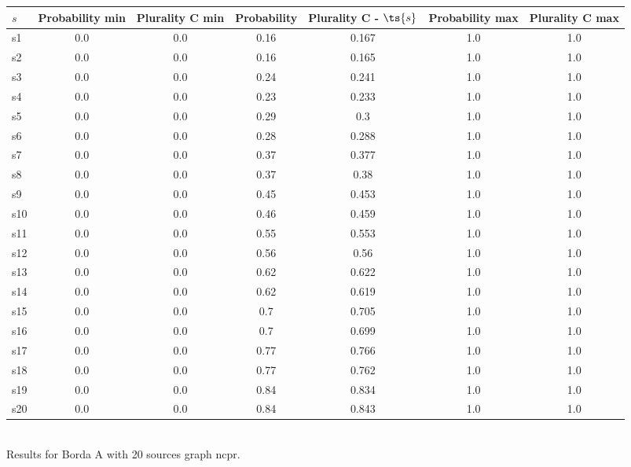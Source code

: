 \documentclass{article}
\begin{document}
\noindent\begin{tabular}{|l|c|c|c|c|c|c|}
\hline
$s$& Probability min & Plurality C min & Probability & Plurality C - $\ts{s}$ & Probability max & Plurality C max\\
\hline
s1 &0.0 & 0.0 & 0.16 & 0.167 & 1.0 & 1.0\\
\hline
s2 &0.0 & 0.0 & 0.16 & 0.165 & 1.0 & 1.0\\
\hline
s3 &0.0 & 0.0 & 0.24 & 0.241 & 1.0 & 1.0\\
\hline
s4 &0.0 & 0.0 & 0.23 & 0.233 & 1.0 & 1.0\\
\hline
s5 &0.0 & 0.0 & 0.29 & 0.3 & 1.0 & 1.0\\
\hline
s6 &0.0 & 0.0 & 0.28 & 0.288 & 1.0 & 1.0\\
\hline
s7 &0.0 & 0.0 & 0.37 & 0.377 & 1.0 & 1.0\\
\hline
s8 &0.0 & 0.0 & 0.37 & 0.38 & 1.0 & 1.0\\
\hline
s9 &0.0 & 0.0 & 0.45 & 0.453 & 1.0 & 1.0\\
\hline
s10 &0.0 & 0.0 & 0.46 & 0.459 & 1.0 & 1.0\\
\hline
s11 &0.0 & 0.0 & 0.55 & 0.553 & 1.0 & 1.0\\
\hline
s12 &0.0 & 0.0 & 0.56 & 0.56 & 1.0 & 1.0\\
\hline
s13 &0.0 & 0.0 & 0.62 & 0.622 & 1.0 & 1.0\\
\hline
s14 &0.0 & 0.0 & 0.62 & 0.619 & 1.0 & 1.0\\
\hline
s15 &0.0 & 0.0 & 0.7 & 0.705 & 1.0 & 1.0\\
\hline
s16 &0.0 & 0.0 & 0.7 & 0.699 & 1.0 & 1.0\\
\hline
s17 &0.0 & 0.0 & 0.77 & 0.766 & 1.0 & 1.0\\
\hline
s18 &0.0 & 0.0 & 0.77 & 0.762 & 1.0 & 1.0\\
\hline
s19 &0.0 & 0.0 & 0.84 & 0.834 & 1.0 & 1.0\\
\hline
s20 &0.0 & 0.0 & 0.84 & 0.843 & 1.0 & 1.0\\
\hline
\end{tabular}\\

\noindent Results for Borda A with 20 sources graph ncpr.
\end{document}

